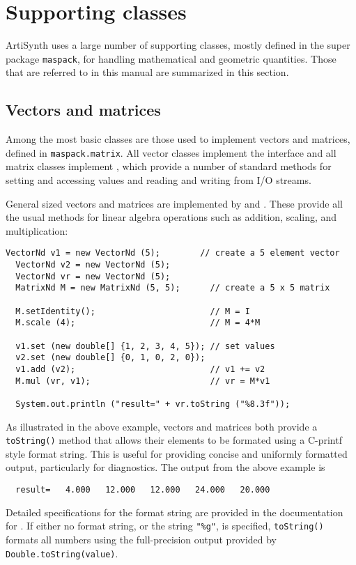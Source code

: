 
\section{Supporting classes}

ArtiSynth uses a large number of supporting classes, mostly defined in
the super package {\tt maspack}, for handling mathematical and
geometric quantities. Those that are referred to in this manual are
summarized in this section.

\subsection{Vectors and matrices}

Among the most basic classes are those used to implement vectors and
matrices, defined in {\tt maspack.matrix}. All vector classes implement
the interface  and all matrix
classes implement , which provide a
number of standard methods for setting and accessing values and
reading and writing from I/O streams. 

General sized vectors and matrices are implemented by
 and
. These provide all the usual
methods for linear algebra operations such as addition, scaling, and
multiplication:
%
\begin{lstlisting}[]
  VectorNd v1 = new VectorNd (5);        // create a 5 element vector
  VectorNd v2 = new VectorNd (5); 
  VectorNd vr = new VectorNd (5); 
  MatrixNd M = new MatrixNd (5, 5);      // create a 5 x 5 matrix

  M.setIdentity();                       // M = I
  M.scale (4);                           // M = 4*M

  v1.set (new double[] {1, 2, 3, 4, 5}); // set values
  v2.set (new double[] {0, 1, 0, 2, 0});
  v1.add (v2);                           // v1 += v2
  M.mul (vr, v1);                        // vr = M*v1

  System.out.println ("result=" + vr.toString ("%8.3f"));
\end{lstlisting}
%
As illustrated in the above example, vectors and matrices both provide
a {\tt toString()} method that allows their elements to be formated
using a C-printf style format string. This is useful for providing
concise and uniformly formatted output, particularly for diagnostics.
The output from the above example is
%
\begin{verbatim}
  result=   4.000   12.000   12.000   24.000   20.000
\end{verbatim}
%
Detailed specifications for the format string are provided in the
documentation for .
If either no format string, or the string {\tt "\%g"}, is specified,
{\tt toString()} formats all numbers using the full-precision output
provided by {\tt Double.toString(value)}.

